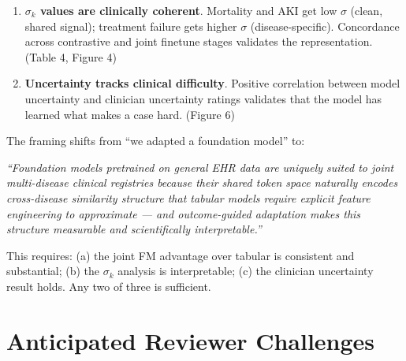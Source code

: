 \documentclass[11pt, a4paper]{article}
\begin{document}
\begin{enumerate}[leftmargin=2em, itemsep=6pt]
  \item \textbf{$\sigma_k$ values are clinically coherent}.
        Mortality and AKI get low $\sigma$ (clean, shared signal);
        treatment failure gets higher $\sigma$ (disease-specific).
        Concordance across contrastive and joint finetune stages
        validates the representation. (Table 4, Figure 4)

  \item \textbf{Uncertainty tracks clinical difficulty}.
        Positive correlation between model uncertainty and clinician
        uncertainty ratings validates that the model has learned what
        makes a case hard. (Figure 6)

\end{enumerate}

\begin{tcolorbox}[planbox, title=If results are strong enough for Nature Machine Intelligence]
  The framing shifts from ``we adapted a foundation model'' to:

  \medskip
  \textit{``Foundation models pretrained on general EHR data are
  uniquely suited to joint multi-disease clinical registries because
  their shared token space naturally encodes cross-disease similarity
  structure that tabular models require explicit feature engineering to
  approximate — and outcome-guided adaptation makes this structure
  measurable and scientifically interpretable.''}

  \medskip
  This requires: (a) the joint FM advantage over tabular is consistent
  and substantial; (b) the $\sigma_k$ analysis is interpretable; (c) the
  clinician uncertainty result holds. Any two of three is sufficient.
\end{tcolorbox}

\section{Anticipated Reviewer Challenges}
\end{document}
